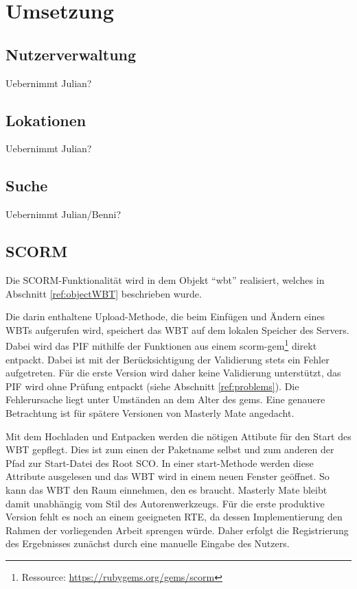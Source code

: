 \chapter{Umsetzung}\label{ref:chaptImplementation}

\section{Nutzerverwaltung}
\begin{k}
Uebernimmt Julian?
\end{k}

\section{Lokationen}
\begin{k}
Uebernimmt Julian?
\end{k}

\section{Suche}
\begin{k}
Uebernimmt Julian/Benni?
\end{k}

\section{SCORM}\label{ref:implSCORM}
Die SCORM-Funktionalität wird in dem Objekt "`wbt"' realisiert, welches in
Abschnitt \ref{ref:objectWBT} beschrieben wurde. 

Die darin enthaltene Upload-Methode, die beim Einfügen und Ändern eines WBTs
aufgerufen wird, speichert das WBT auf dem lokalen Speicher des Servers. Dabei
wird das \ac{PIF} mithilfe der Funktionen aus einem
scorm-gem\footnote{Ressource: \url{https://rubygems.org/gems/scorm}} direkt
entpackt. Dabei ist mit der Berücksichtigung der Validierung stets ein Fehler
aufgetreten. Für die erste Version wird daher keine Validierung unterstützt, das
PIF wird ohne Prüfung entpackt (siehe Abschnitt \ref{ref:problems}). Die
Fehlerursache liegt unter Umständen an dem Alter des gems. Eine genauere Betrachtung ist für
spätere Versionen von Masterly Mate angedacht. 

Mit dem Hochladen und Entpacken werden die nötigen Attibute für den Start des
WBT gepflegt. Dies ist zum einen der Paketname selbst und zum anderen der Pfad
zur Start-Datei des Root SCO. In einer start-Methode werden diese Attribute
ausgelesen und das WBT wird in einem neuen Fenster geöffnet. So kann das WBT den
Raum einnehmen, den es braucht. Masterly Mate bleibt damit unabhängig vom Stil
des Autorenwerkzeugs. Für die erste produktive Version fehlt es noch an einem
geeigneten RTE, da dessen Implementierung den Rahmen der vorliegenden Arbeit
sprengen würde. Daher erfolgt die Registrierung des Ergebnisses zunächst durch
eine manuelle Eingabe des Nutzers.

